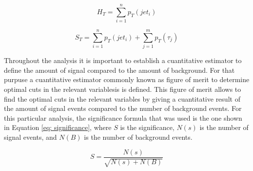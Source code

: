 \begin{equation}
 H_{T} = \sum_{i=1}^{n} p_{T}(jet_{i})
 \label{eq: HT}
\end{equation}

\begin{equation}
 S_{T} = \sum_{i=1}^{n} p_{T}(jet_{i}) + \sum_{j=1}^{m} p_{T}(\tau_{j})
 \label{eq: ST}
\end{equation}

Throughout the analysis it is important to establish a cuantitative estimator to define the amount of signal compared to the amount of background. For that purpuse a cuantitative estimator commonly known as figure of merit to determine optimal cuts in the relevant variablesis is defined. This figure of merit allows to find the optimal cuts in the relevant variables by giving a cuantitative result of the amount of signal events compared to the number of background events. For this particular analysis, the significance formula that was used is the one shown in Equation \ref{eq: significance}, where $S$ is the significance, $N(s)$ is the number of signal events, and $N(B)$ is the number of background events.

\begin{equation} \label{eq: significance}
    S = \frac{N(s)}{\sqrt{N(s) + N(B)}}
\end{equation}






 




